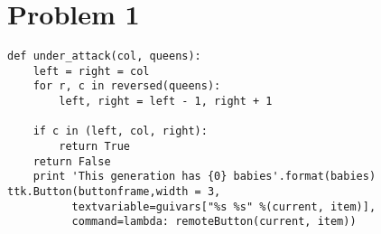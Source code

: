 \section*{Problem 1}


\begin{lstlisting} 
def under_attack(col, queens):
	left = right = col
	for r, c in reversed(queens):
		left, right = left - 1, right + 1

	if c in (left, col, right):
		return True
	return False
	print 'This generation has {0} babies'.format(babies)
ttk.Button(buttonframe,width = 3, 
		  textvariable=guivars["%s %s" %(current, item)],
		  command=lambda: remoteButton(current, item))
\end{lstlisting}